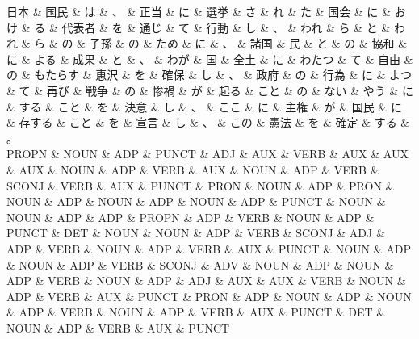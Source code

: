 \documentclass[tikz,border=5pt]{standalone}
\begin{document}
\fontsize{5pt}{6pt}\selectfont
\begin{dependency}[edge unit distance=2.7pt]
    \begin{deptext}[column sep=0.3em]
        日本 \& 国民 \& は \& 、 \& 正当 \& に \& 選挙 \& さ \& れ \& た \& 国会 \& に \& おけ \& る \& 代表者 \& を \& 通じ \& て \& 行動 \& し \& 、 \& われ \& ら \& と \& われ \& ら \& の \& 子孫 \& の \& ため \& に \& 、 \& 諸国 \& 民 \& と \& の \& 協和 \& に \& よる \& 成果 \& と \& 、 \& わが \& 国 \& 全土 \& に \& わたつ \& て \& 自由 \& の \& もたらす \& 恵沢 \& を \& 確保 \& し \& 、 \& 政府 \& の \& 行為 \& に \& よつ \& て \& 再び \& 戦争 \& の \& 惨禍 \& が \& 起る \& こと \& の \& ない \& やう \& に \& する \& こと \& を \& 決意 \& し \& 、 \& ここ \& に \& 主権 \& が \& 国民 \& に \& 存する \& こと \& を \& 宣言 \& し \& 、 \& この \& 憲法 \& を \& 確定 \& する \& 。\\
        PROPN \& NOUN \& ADP \& PUNCT \& ADJ \& AUX \& VERB \& AUX \& AUX \& AUX \& NOUN \& ADP \& VERB \& AUX \& NOUN \& ADP \& VERB \& SCONJ \& VERB \& AUX \& PUNCT \& PRON \& NOUN \& ADP \& PRON \& NOUN \& ADP \& NOUN \& ADP \& NOUN \& ADP \& PUNCT \& NOUN \& NOUN \& ADP \& ADP \& PROPN \& ADP \& VERB \& NOUN \& ADP \& PUNCT \& DET \& NOUN \& NOUN \& ADP \& VERB \& SCONJ \& ADJ \& ADP \& VERB \& NOUN \& ADP \& VERB \& AUX \& PUNCT \& NOUN \& ADP \& NOUN \& ADP \& VERB \& SCONJ \& ADV \& NOUN \& ADP \& NOUN \& ADP \& VERB \& NOUN \& ADP \& ADJ \& AUX \& AUX \& VERB \& NOUN \& ADP \& VERB \& AUX \& PUNCT \& PRON \& ADP \& NOUN \& ADP \& NOUN \& ADP \& VERB \& NOUN \& ADP \& VERB \& AUX \& PUNCT \& DET \& NOUN \& ADP \& VERB \& AUX \& PUNCT\\
    \end{deptext}

\end{dependency}
\end{document}
